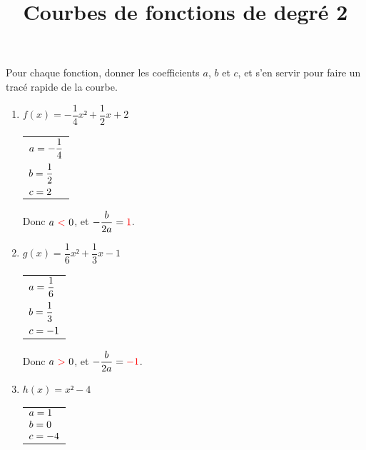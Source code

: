 \documentclass[
	classe=$1^{ere}STI2D$,
]{exercice}
\title{Courbes de fonctions de degré 2}
\begin{document}
\maketitle

Pour chaque fonction, donner les coefficients $a$, $b$ et $c$, et s'en servir pour faire un tracé rapide de la courbe.

\begin{multicols}{2}
	\begin{enumerate}
		\item $f(x) = -\dfrac{1}{4}x² + \dfrac{1}{2}x + 2$ \hspace{2em} \begin{tabular}{l}
			      $a = \correctionOr{-\dfrac{1}{4}}{.....}$ \\
			      $b = \correctionOr{\dfrac{1}{2}}{.....}$  \\
			      $c = \correctionOr{2}{.....}$
		      \end{tabular}

		      Donc $a\ \correctionDots{<}\ 0$, et $-\dfrac{b}{2a} = \correctionDots{1}$.

		      \begin{center}
		      \end{center}
		\item $g(x) = \dfrac{1}{6}x² + \dfrac{1}{3}x - 1$ \hspace{2em} \begin{tabular}{l}
			      $a = \correctionOr{\dfrac{1}{6}}{.....}$ \\
			      $b = \correctionOr{\dfrac{1}{3}}{.....}$  \\
			      $c = \correctionOr{-1}{.....}$
		      \end{tabular}

		      Donc $a\ \correctionDots{>}\ 0$, et $-\dfrac{b}{2a} = \correctionDots{-1}$.

		      \begin{center}
		      \end{center}
		\item $h(x) = x² - 4$ \hspace{2em} \begin{tabular}{l}
			      $a = \correctionOr{1}{.....}$ \\
			      $b = \correctionOr{0}{.....}$  \\
			      $c = \correctionOr{-4}{.....}$
		      \end{tabular}


\end{enumerate}
\end{multicols}
\end{document}
